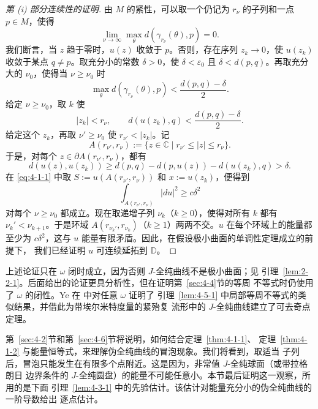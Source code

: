 \begin{proof}[第 \textup{(i)} 部分连续性的证明]
由 $M$ 的紧性，可以取一个仍记为 $r_\nu$ 的子列和一点 $p\in M$，使得
\[
  \lim_{\nu\to\infty}\max_\theta d(\gamma_{r_\nu}(\theta),p)=0.
\]
我们断言，当 $z$ 趋于零时，$u(z)$ 收敛于 $p$。否则，存在序列 $z_k\to0$，使
$u(z_k)$ 收敛于某点 $q\ne p$。取充分小的常数 $\delta>0$，使
$\delta<\varepsilon_0$ 且 $\delta<d(p,q)$。再取充分大的 $\nu_0$，使得当
$\nu\ge\nu_0$ 时
\[
  \max_\theta d(\gamma_{r_\nu}(\theta),p)
  <\frac{d(p,q)-\delta}{2}.
\]
给定 $\nu\ge\nu_0$，取 $k$ 使
\[
  |z_k|<r_\nu,
  \qquad
  d(u(z_k),q)<\frac{d(p,q)-\delta}{2}.
\]
给定这个 $z_k$，再取 $\nu'\ge\nu_0$ 使 $r_{\nu'}<|z_k|$。记
\[
  A(r_{\nu'},r_\nu)
  :=\{z\in\mathbb C\mid r_{\nu'}\le |z|\le r_\nu\}.
\]
于是，对每个 $z\in\partial A(r_{\nu'},r_\nu)$，都有
\[
  d(u(z),u(z_k))
  \ge d(p,q)-d(p,u(z))-d(u(z_k),q)
  >\delta.
\]
在 \eqref{eq:4-1-1} 中取
$S:=u(A(r_{\nu'},r_\nu))$ 和 $x:=u(z_k)$，便得到
\[
  \int_{A(r_{\nu'},r_\nu)}|du|^2\ge c\delta^2
\]
对每个 $\nu\ge\nu_0$ 都成立。现在取递增子列
$\nu_k$（$k\ge0$），使得对所有 $k$ 都有 $\nu_k'<\nu_{k+1}$。于是环域
$A(r_{\nu_k'},r_{\nu_k})$（$k\ge1$）两两不交。$u$ 在每个环域上的能量都至少为
$c\delta^2$，这与 $u$ 能量有限矛盾。因此，在假设极小曲面的单调性定理成立的前提下，
我们已经证明 $u$ 可连续延拓到 $\mathbb D$。
\end{proof}

\begin{remark}\label{rem:4-1-3}
上述论证只在 $\omega$ 闭时成立，因为否则 $J$-全纯曲线不是极小曲面；见
引理~\ref{lem:2-2-1}。后面给出的论证更具分析性，但在证明第~\ref{sec:4-4}节的等周
不等式时仍使用了 $\omega$ 的闭性。Ye 在  中对任意 $\omega$ 证明了
引理~\ref{lem:4-5-1} 中局部等周不等式的类似结果，并借此为带埃尔米特度量的紧殆复
流形中的 $J$-全纯曲线建立了可去奇点定理。
\end{remark}

第~\ref{sec:4-2}节和第~\ref{sec:4-6}节将说明，如何结合定理~\ref{thm:4-1-1}、
定理~\ref{thm:4-1-2} 与能量恒等式，来理解伪全纯曲线的冒泡现象。我们将看到，取适当
子列后，冒泡只能发生在有限多个点附近。这是因为，非常值 $J$-全纯球面（或带拉格朗日
边界条件的 $J$-全纯圆盘）的能量不可能任意小。本节最后证明这一观察，所用的是下面
引理~\ref{lem:4-3-1} 中的先验估计。该估计对能量充分小的伪全纯曲线的一阶导数给出
逐点估计。

